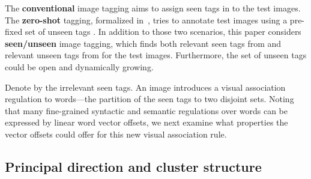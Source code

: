 \documentclass[10pt,twocolumn,letterpaper]{article}
\newcommand{\eat}[1]{{}}
\begin{document}
The \textbf{conventional} image tagging aims to assign seen tags in  to the test images. The \textbf{zero-shot} tagging, formalized in~\cite{fu_transductive_2015}, tries to annotate test images using a pre-fixed set of unseen tags . In addition to those two scenarios, this paper  considers \textbf{seen/unseen} image tagging, which finds both relevant seen tags from  and relevant unseen tags from  for the test images. Furthermore, the set of unseen tags  could be open and dynamically growing. 

Denote by  the irrelevant seen tags. An image  introduces a visual association regulation to words---the partition  of  the seen tags to two disjoint sets. Noting that many fine-grained syntactic and semantic regulations over words can be expressed by  linear word vector offsets, we next examine what properties the vector offsets could offer for this new visual association rule.



\eat{
Before defining zero-shot label ranking problem, which is the problem we would focus in this paper, let us revisit the conventional label ranking problem. Given a set of  instances  .In our case these are  images. For each , we are trying to rank  labels in another instance set , so that the correct  ranks higher than incorrect .

In conventional ranking problem,  are instances represented in continuous space.  are discrete labels consistent in training set and testing set. A general approach is to estimate a ranking function , where  quantifies association between the th query  and  labels in .

In the zero-shot label ranking problem, our model are not only ranking   labels presenting in training set, but also ranking additional  unseen tags . So we are estimating a ranking function  where . Since  are not presented in the training stage, we need to transfer the knowledge by representing  in a continuous feature space just like , known as label embedding space.
}






\subsection{Principal direction and cluster structure} \label{sStructure}
\end{document}
